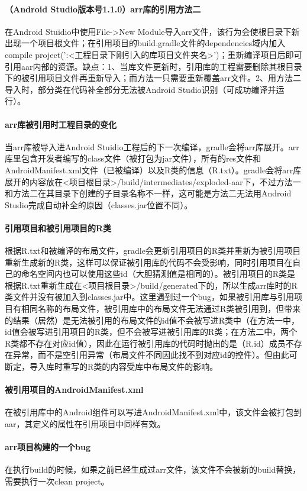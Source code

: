 \documentclass[UTF8]{ctexart}
\begin{document}
    \paragraph{（Android Studio版本号1.1.0）arr库的引用方法二}
    在Android Stuidio中使用File->New Module导入arr文件，该行为会使根目录下新出现一个项目根文件；在引用项目的build.gradle文件的dependencies域内加入compile project(':<工程目录下刚引入的库项目文件夹名>')；重新编译项目后即可引用aar内部的资源。缺点：1、当库文件更新时，引用库的工程需要删除其根目录下的被引用项目文件再重新导入；而方法一只需要重新覆盖arr文件。2、用方法二导入时，部分类在代码补全部分无法被Android Studio识别（可成功编译并运行）。
    \paragraph{arr库被引用时工程目录的变化}
    当arr库被导入进Android Stuidio工程后的下一次编译，gradle会将arr库展开。arr库里包含开发者编写的class文件（被打包为jar文件），所有的res文件和AndroidManifest.xml文件（已被编译）以及R类的信息（R.txt）。gradle会将arr库展开的内容放在<项目根目录>/build/intermediates/exploded-aar下，不过方法一和方法二在其目录下创建的子目录名称不一样，这可能是方法二无法用Android Studio完成自动补全的原因（classes.jar位置不同）。
    \paragraph{引用项目和被引用项目的R类}
    根据R.txt和被编译的布局文件，gradle会更新引用项目的R类并重新为被引用项目重新生成新的R类，这样可以保证被引用库的代码不会受影响，同时引用项目在自己的命名空间内也可以使用这些id（大胆猜测值是相同的）。被引用项目的R类是根据R.txt重新生成在<项目根目录>/build/generated下的，所以生成arr库时的R类文件并没有被加入到classes.jar中。这里遇到过一个bug，如果被引用库与引用项目有相同名称的布局文件，被引用库中的布局文件无法通过R类被引用到，但带来的结果（居然）是无法被引用的布局文件的id值不会被写进R类中（在方法一中，id值会被写进引用项目的R类，但不会被写进被引用库的R类；在方法二中，两个R类都不存在对应id值），因此在运行被引用库的代码时抛出的是（R.id）成员不存在异常，而不是空引用异常（布局文件不同因此找不到对应id的控件）。但由此可断定，导入库时重写的R类的内容受库中布局文件的影响。
    \paragraph{被引用项目的AndroidManifest.xml}
    在被引用库中的Android组件可以写进AndroidManifest.xml中，该文件会被打包到aar，其定义的属性在引用项目中同样有效。
    \paragraph{arr项目构建的一个bug}
    在执行build的时候，如果之前已经生成过arr文件，该文件不会被新的build替换，需要执行一次clean project。
\end{document}
